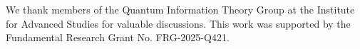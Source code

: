 We thank members of the Quantum Information Theory Group at the Institute for Advanced Studies for valuable discussions. This work was supported by the Fundamental Research Grant No. FRG-2025-Q421. 